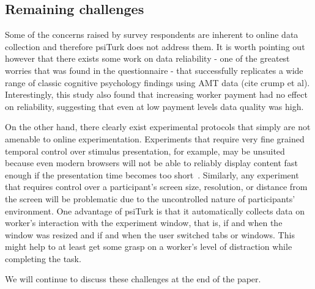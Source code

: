 \documentclass[twocolumn]{svjour3}          %
\begin{document}
\subsection{Remaining challenges}
Some of the concerns raised by survey respondents are inherent to online data collection and therefore psiTurk does
not address them.
It is worth pointing out however that there exists some work on data reliability - one of the greatest worries that was found
in the questionnaire - that successfully replicates a wide range of classic cognitive psychology findings using AMT data (cite crump
et al). Interestingly, this study also found that increasing worker payment had no effect on reliability, suggesting that even 
at low payment levels data quality was high. 

On the other hand, there clearly exist experimental protocols that simply are not amenable to online
experimentation. Experiments that require very fine grained temporal control over stimulus presentation, for example, 
may be unsuited because even modern browsers will not be able to reliably display content fast enough if the presentation time
becomes too short~\citep{crump2013evaluating}.
Similarly, any experiment that requires  control over a participant's screen size, resolution, or distance
from the screen will be problematic due to the uncontrolled nature of participants' environment. One advantage of psiTurk is that
it automatically collects data on worker's interaction with the experiment window, that is, if and when the window was resized and
if and when the user switched tabs or windows. This might help to at least get some grasp on a worker's level of distraction while completing
the task. 

We will continue to discuss these challenges at the end of the paper.


\end{document}
